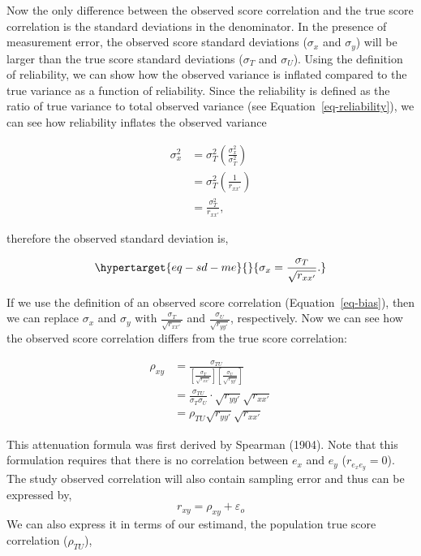\documentclass[
  letterpaper,
  DIV=11,
  numbers=noendperiod]{scrreprt}
\begin{document}
Now the only difference between the observed score correlation and the
true score correlation is the standard deviations in the denominator. In
the presence of measurement error, the observed score standard
deviations (\(\sigma_x\) and \(\sigma_y\)) will be larger than the true
score standard deviations (\(\sigma_{T}\) and \(\sigma_{U}\)). Using the
definition of reliability, we can show how the observed variance is
inflated compared to the true variance as a function of reliability.
Since the reliability is defined as the ratio of true variance to total
observed variance (see Equation~\ref{eq-reliability}), we can see how
reliability inflates the observed variance

\begin{align}
\sigma^2_x &=\sigma^2_{T} \left(\frac{\sigma^2_{x}}{\sigma^2_{T}} \right)
\\ &= \sigma^2_{T}\left(\frac{1}{r_{xx'}} \right)
\\ &= \frac{\sigma^2_{T}}{r_{xx'}},
\end{align}

therefore the observed standard deviation is,

\begin{equation}\protect\hypertarget{eq-sd-me}{}{
\sigma_x = \frac{\sigma_{T}}{\sqrt{r_{xx'}}}.
}\label{eq-sd-me}\end{equation}

If we use the definition of an observed score correlation
(Equation~\ref{eq-bias}), then we can replace \(\sigma_x\) and
\(\sigma_y\) with \(\frac{\sigma_{T}}{\sqrt{r_{xx'}}}\) and
\(\frac{\sigma_{U}}{\sqrt{r_{yy'}}}\), respectively. Now we can see how
the observed score correlation differs from the true score correlation:

\begin{align}
\rho_{xy} &= \frac{\sigma_{T U}}{\left[\frac{\sigma_{T}}{\sqrt{r_{xx'}}} \right] \left[ \frac{\sigma_{U}}{\sqrt{r_{yy'}}} \right] } 
\\ &= \frac{\sigma_{T U}}{\sigma_{T}\sigma_{U}} \cdot \sqrt{r_{yy'}}\sqrt{r_{xx'}}
\\ &= \rho_{TU} \sqrt{r_{yy'}}\sqrt{r_{xx'}} 
\end{align}

This attenuation formula was first derived by Spearman (1904). Note that
this formulation requires that there is no correlation between \(e_x\)
and \(e_y\) (\(r_{e_xe_y}=0\)). The study observed correlation will also
contain sampling error and thus can be expressed by, \[
r_{xy} = \rho_{xy} + \varepsilon_o
\] We can also express it in terms of our estimand, the population true
score correlation (\(\rho_{TU}\)),
\end{document}
